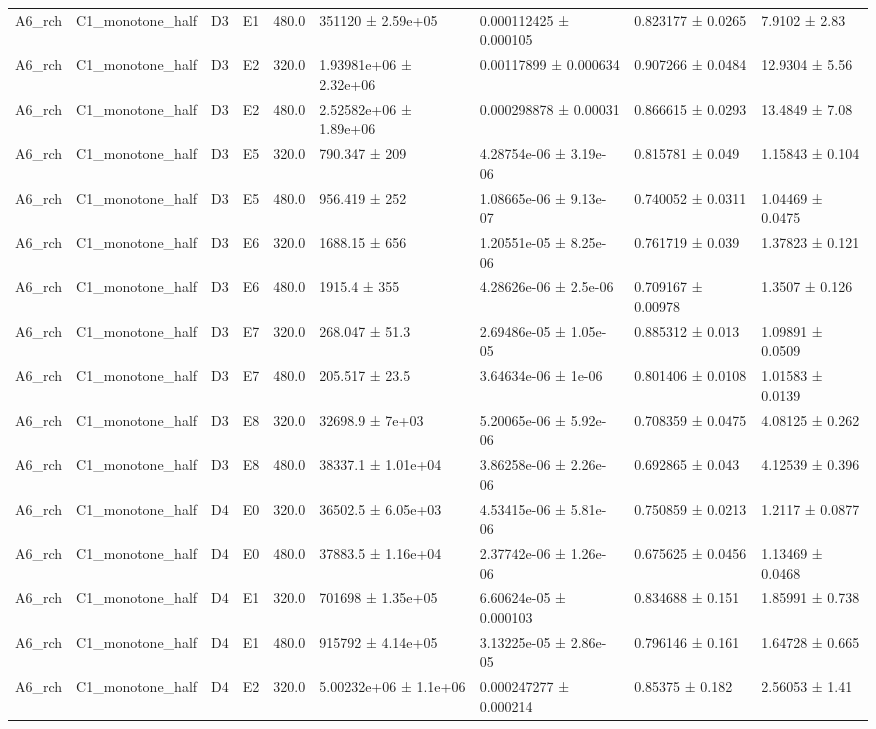 \begin{table}
\begin{tabular}{lllllllll}
A6\_rch & C1\_monotone\_half & D3 & E1 & 480.0 & 351120 ± 2.59e+05 & 0.000112425 ± 0.000105 & 0.823177 ± 0.0265 & 7.9102 ± 2.83 \\
A6\_rch & C1\_monotone\_half & D3 & E2 & 320.0 & 1.93981e+06 ± 2.32e+06 & 0.00117899 ± 0.000634 & 0.907266 ± 0.0484 & 12.9304 ± 5.56 \\
A6\_rch & C1\_monotone\_half & D3 & E2 & 480.0 & 2.52582e+06 ± 1.89e+06 & 0.000298878 ± 0.00031 & 0.866615 ± 0.0293 & 13.4849 ± 7.08 \\
A6\_rch & C1\_monotone\_half & D3 & E5 & 320.0 & 790.347 ± 209 & 4.28754e-06 ± 3.19e-06 & 0.815781 ± 0.049 & 1.15843 ± 0.104 \\
A6\_rch & C1\_monotone\_half & D3 & E5 & 480.0 & 956.419 ± 252 & 1.08665e-06 ± 9.13e-07 & 0.740052 ± 0.0311 & 1.04469 ± 0.0475 \\
A6\_rch & C1\_monotone\_half & D3 & E6 & 320.0 & 1688.15 ± 656 & 1.20551e-05 ± 8.25e-06 & 0.761719 ± 0.039 & 1.37823 ± 0.121 \\
A6\_rch & C1\_monotone\_half & D3 & E6 & 480.0 & 1915.4 ± 355 & 4.28626e-06 ± 2.5e-06 & 0.709167 ± 0.00978 & 1.3507 ± 0.126 \\
A6\_rch & C1\_monotone\_half & D3 & E7 & 320.0 & 268.047 ± 51.3 & 2.69486e-05 ± 1.05e-05 & 0.885312 ± 0.013 & 1.09891 ± 0.0509 \\
A6\_rch & C1\_monotone\_half & D3 & E7 & 480.0 & 205.517 ± 23.5 & 3.64634e-06 ± 1e-06 & 0.801406 ± 0.0108 & 1.01583 ± 0.0139 \\
A6\_rch & C1\_monotone\_half & D3 & E8 & 320.0 & 32698.9 ± 7e+03 & 5.20065e-06 ± 5.92e-06 & 0.708359 ± 0.0475 & 4.08125 ± 0.262 \\
A6\_rch & C1\_monotone\_half & D3 & E8 & 480.0 & 38337.1 ± 1.01e+04 & 3.86258e-06 ± 2.26e-06 & 0.692865 ± 0.043 & 4.12539 ± 0.396 \\
A6\_rch & C1\_monotone\_half & D4 & E0 & 320.0 & 36502.5 ± 6.05e+03 & 4.53415e-06 ± 5.81e-06 & 0.750859 ± 0.0213 & 1.2117 ± 0.0877 \\
A6\_rch & C1\_monotone\_half & D4 & E0 & 480.0 & 37883.5 ± 1.16e+04 & 2.37742e-06 ± 1.26e-06 & 0.675625 ± 0.0456 & 1.13469 ± 0.0468 \\
A6\_rch & C1\_monotone\_half & D4 & E1 & 320.0 & 701698 ± 1.35e+05 & 6.60624e-05 ± 0.000103 & 0.834688 ± 0.151 & 1.85991 ± 0.738 \\
A6\_rch & C1\_monotone\_half & D4 & E1 & 480.0 & 915792 ± 4.14e+05 & 3.13225e-05 ± 2.86e-05 & 0.796146 ± 0.161 & 1.64728 ± 0.665 \\
A6\_rch & C1\_monotone\_half & D4 & E2 & 320.0 & 5.00232e+06 ± 1.1e+06 & 0.000247277 ± 0.000214 & 0.85375 ± 0.182 & 2.56053 ± 1.41 \\

\end{tabular}
\end{table}
